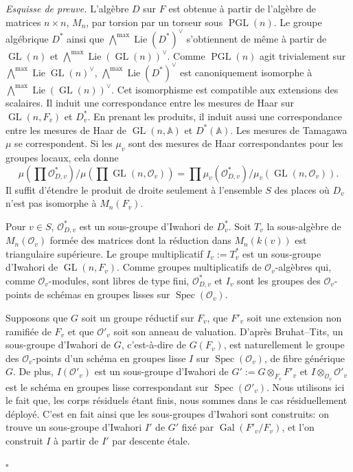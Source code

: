 \documentclass[10pt]{article}
\newcommand{\Adele}{\mathbb A}
\newcommand{\GL}{\operatorname{GL}}
\newcommand{\PGL}{\operatorname{PGL}}
\newcommand{\Gal}{\operatorname{Gal}}
\newcommand{\Spec}{\operatorname{Spec}}
\newcommand{\Lie}{\operatorname{Lie}}
\newcommand{\OO}{\mathcal O}
\theoremstyle{deligne}
\newenvironment{sketchproof}[1][Esquisse de preuve.]{\textit{#1}}{\hfill$\square$}
\begin{document}
\begin{sketchproof}
L'algèbre $D$ sur $F$ est obtenue à partir de l'algèbre de matrices $n\times n$, $M_n$, par torsion par un torseur sous $\PGL(n)$. Le groupe algébrique $D^*$ ainsi que $\bigwedge^{\max}\Lie(D^*)^\vee$ s'obtiennent de même à partir de $\GL(n)$ et $\bigwedge^{\max}\Lie(\GL(n))^\vee$. Comme $\PGL(n)$ agit trivialement sur $\bigwedge^{\max}\Lie\GL(n)^\vee$, $\bigwedge^{\max}\Lie(D^*)^\vee$ est canoniquement isomorphe à $\bigwedge^{\max}\Lie(\GL(n))^\vee$. Cet isomorphisme est compatible aux extensions des scalaires. Il induit une correspondance entre les mesures de Haar sur $\GL(n,F_v)$ et $D_v^*$. En prenant les produits, il induit aussi une correspondance entre les mesures de Haar de $\GL(n,\Adele)$ et $D^*(\Adele)$. Les mesures de Tamagawa $\mu$ se correspondent. Si les $\mu_v$ sont des mesures de Haar correspondantes pour les groupes locaux, cela donne
\begin{equation}\tag{3.11.4}
\mu\left(\prod\mathcal O_{D,v}^*\right)/\mu\left(\prod\GL(n,\OO_v)\right)=\prod \mu_v(\mathcal O_{D,v}^*)/\mu_v(\GL(n,\OO_v)).
\end{equation}
Il suffit d'étendre le produit de droite seulement à l'ensemble $S$ des places où $D_v$ n'est pas isomorphe à $M_n(F_v)$.

Pour $v\in S$, $\mathcal O_{D,v}^*$ est un sous-groupe d'Iwahori de $D_v^*$. Soit $T_v$ la sous-algèbre de $M_n(\OO_v)$ formée des matrices dont la réduction dans $M_n(k(v))$ est triangulaire supérieure. Le groupe multiplicatif $I_v:=T_v^*$ est un sous-groupe d'Iwahori de $\GL(n,F_v)$. Comme groupes multiplicatifs de $\OO_v$-algèbres qui, comme $\OO_v$-modules, sont libres de type fini, $\mathcal O_{D,v}^*$ et $I_v$ sont les groupes des $\OO_v$-points de schémas en groupes lisses sur $\Spec(\OO_v)$.

Supposons que $G$ soit un groupe réductif sur $F_v$, que $F'_v$ soit une extension non ramifiée de $F_v$ et que $\OO'_v$ soit son anneau de valuation. D'après Bruhat--Tits, un sous-groupe d'Iwahori de $G$, c'est-à-dire de $G(F_v)$, est naturellement le groupe des $\OO_v$-points d'un schéma en groupes lisse $I$ sur $\Spec(\OO_v)$, de fibre générique $G$. De plus, $I(\OO'_v)$ est un sous-groupe d'Iwahori de $G':=G\otimes_{F_v}F'_v$ et $I\otimes_{\OO_v}\OO'_v$ est le schéma en groupes lisse correspondant sur $\Spec(\OO'_v)$. Nous utilisons ici le fait que, les corps résiduels étant finis, nous sommes dans le cas résiduellement déployé. C'est en fait ainsi que les sous-groupes d'Iwahori sont construits: on trouve un sous-groupe d'Iwahori $I'$ de $G'$ fixé par $\Gal(F'_v/F_v)$, et l'on construit $I$ à partir de $I'$ par descente \'{e}tale.


\end{sketchproof}
\end{document}
